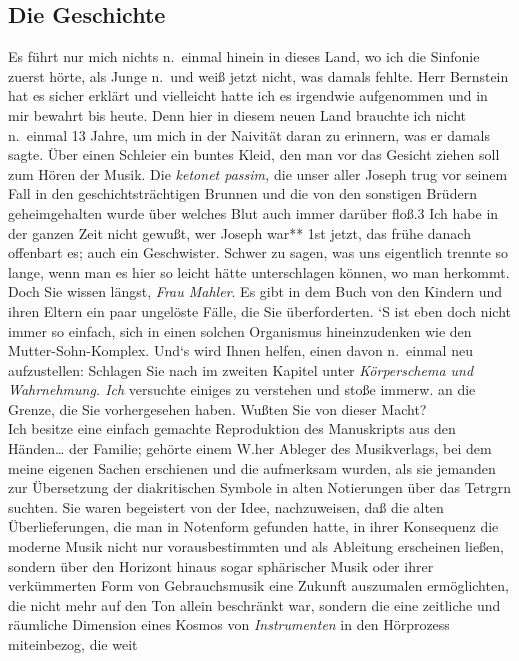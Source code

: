 \documentclass[
]{article}
\author{}
\date{\vspace{-2.5em}}
\begin{document}
\subsection{Die Geschichte}\label{die-geschichte}

Es führt nur mich nichts n.~einmal hinein in dieses Land, wo ich die
Sinfonie zuerst hörte, als Junge n.~und weiß jetzt nicht, was damals
fehlte. Herr Bernstein hat es sicher erklärt und vielleicht hatte ich es
irgendwie aufgenommen und in mir bewahrt bis heute. Denn hier in diesem
neuen Land brauchte ich nicht n.~einmal 13 Jahre, um mich in der
Naivität daran zu erinnern, was er damals sagte. Über einen Schleier ein
buntes Kleid, den man vor das Gesicht ziehen soll zum Hören der Musik.
Die \emph{ketonet passim, }die unser aller Joseph trug vor seinem Fall
in den geschichtsträchtigen Brunnen und die von den sonstigen Brüdern
geheimgehalten wurde über welches Blut auch immer darüber floß.3 Ich
habe in der ganzen Zeit nicht gewußt, wer Joseph war** 1st jetzt, das
frühe danach offenbart es; auch ein Geschwister. Schwer zu sagen, was
uns eigentlich trennte so lange, wenn man es hier so leicht hätte
unterschlagen können, wo man herkommt. Doch Sie wissen längst,
\emph{Frau Mahler}. Es gibt in dem Buch von den Kindern und ihren Eltern
ein paar ungelöste Fälle, die Sie überforderten. `S ist eben doch nicht
immer so einfach, sich in einen solchen Organismus hineinzudenken wie
den Mutter-Sohn-Komplex. Und`s wird Ihnen helfen, einen davon n.~einmal
neu aufzustellen: Schlagen Sie nach im zweiten Kapitel unter
\emph{Körperschema und Wahrnehmung. Ich} versuchte einiges zu verstehen
und stoße immerw. an die Grenze, die Sie vorhergesehen haben. Wußten Sie
von dieser Macht?\\
Ich besitze eine einfach gemachte Reproduktion des Manuskripts aus den
Händen\ldots{} der Familie; gehörte einem W.her Ableger des
Musikverlags, bei dem meine eigenen Sachen erschienen und die aufmerksam
wurden, als sie jemanden zur Übersetzung der diakritischen Symbole in
alten Notierungen über das Tetr\textquotesingle gr\textquotesingle n
suchten. Sie waren begeistert von der Idee, nachzuweisen, daß die alten
Überlieferungen, die man in Notenform gefunden hatte, in ihrer
Konsequenz die moderne Musik nicht nur vorausbestimmten und als
Ableitung erscheinen ließen, sondern über den Horizont hinaus sogar
sphärischer Musik oder ihrer verkümmerten Form von Gebrauchsmusik eine
Zukunft auszumalen ermöglichten, die nicht mehr auf den Ton allein
beschränkt war, sondern die eine zeitliche und räumliche Dimension eines
Kosmos von \emph{Instrumenten} in den Hörprozess miteinbezog, die weit
\end{document}
